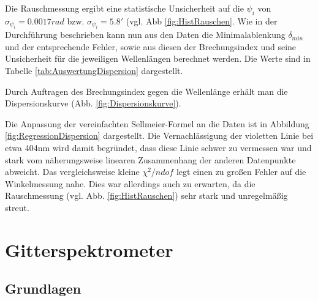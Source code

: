 \documentclass[12pt,a4paper]{article}
\begin{document}
Die Rauschmessung ergibt eine statistische Unsicherheit auf die $\psi_i$ von $\sigma_{\psi_i} = 0.0017 rad$ bzw. $\sigma_{\psi_i} = 5.8'$ (vgl. Abb \ref{fig:HistRauschen}. Wie in der Durchführung beschrieben kann nun aus den Daten die Minimalablenkung $\delta_{min}$ und der entsprechende Fehler, sowie aus diesen der Brechungsindex und seine Unsicherheit für die jeweiligen Wellenlängen berechnet werden.
Die Werte sind in Tabelle \ref{tab:AuswertungDispersion} dargestellt.

Durch Auftragen des Brechungsindex gegen die Wellenlänge erhält man die Dispersionskurve (Abb. \ref{fig:Dispersionskurve}).

Die Anpassung der vereinfachten Sellmeier-Formel an die Daten ist in Abbildung \ref{fig:RegressionDispersion} dargestellt. Die Vernachlässigung der violetten Linie bei etwa 404nm wird damit begründet, dass diese Linie schwer zu vermessen war und stark vom näherungsweise linearen Zusammenhang der anderen Datenpunkte abweicht.
Das vergleichsweise kleine $\chi^2 / ndof$ legt einen zu großen Fehler auf die Winkelmessung nahe. Dies war allerdings auch zu erwarten, da die Rauschmessung (vgl. Abb. \ref{fig:HistRauschen}) sehr stark und unregelmäßig streut.




\newpage
\section{Gitterspektrometer}

\subsection{Grundlagen}
\end{document}
